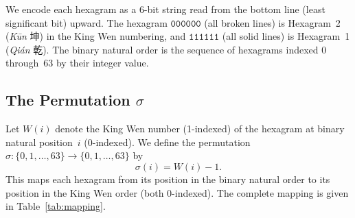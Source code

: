 \documentclass[11pt,a4paper]{article}
\begin{document}
We encode each hexagram as a 6-bit string read from the bottom line (least significant bit) upward.
The hexagram $\texttt{000000}$ (all broken lines) is Hexagram~2 (\textit{Kūn} 坤) in the King Wen numbering, and $\texttt{111111}$ (all solid lines) is Hexagram~1 (\textit{Qián} 乾).
The binary natural order is the sequence of hexagrams indexed $0$ through~$63$ by their integer value.

\subsection{The Permutation $\sigma$}

Let $W(i)$ denote the King Wen number (1-indexed) of the hexagram at binary natural position~$i$ (0-indexed).
We define the permutation $\sigma\colon \{0,1,\ldots,63\} \to \{0,1,\ldots,63\}$ by
\begin{equation}\label{eq:sigma}
  \sigma(i) = W(i) - 1.
\end{equation}
This maps each hexagram from its position in the binary natural order to its position in the King Wen order (both 0-indexed).
The complete mapping is given in Table~\ref{tab:mapping}.
\end{document}
